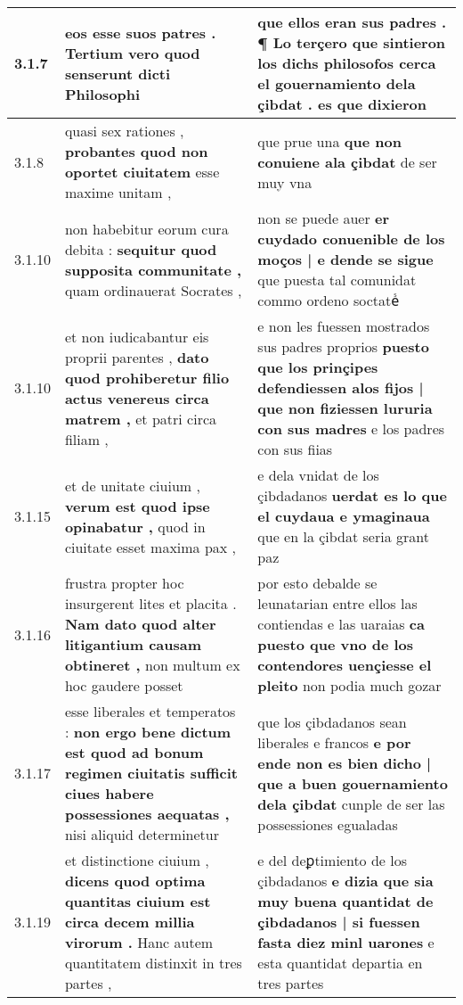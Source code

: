 \begin{tabular}{|p{1cm}|p{6.5cm}|p{6.5cm}|}
3.1.7 & eos esse suos patres . \textbf{ Tertium vero quod senserunt } dicti Philosophi & que ellos eran sus padres . \textbf{ ¶ Lo terçero que sintieron los dichs philosofos cerca el gouernamiento dela çibdat . } es que dixieron \\\hline
3.1.8 & quasi sex rationes , \textbf{ probantes quod non oportet ciuitatem } esse maxime unitam , & que prue una \textbf{ que non conuiene ala çibdat } de ser muy vna \\\hline
3.1.10 & non habebitur eorum cura debita : \textbf{ sequitur quod supposita communitate , } quam ordinauerat Socrates , & non se puede auer \textbf{ er cuydado conuenible de los moços | e dende se sigue } que puesta tal comunidat commo ordeno soctateᷤ \\\hline
3.1.10 & et non iudicabantur eis proprii parentes , \textbf{ dato quod prohiberetur filio actus venereus circa matrem , } et patri circa filiam , & e non les fuessen mostrados sus padres proprios \textbf{ puesto que los prinçipes defendiessen alos fijos | que non fiziessen lururia con sus madres } e los padres con sus fiias \\\hline
3.1.15 & et de unitate ciuium , \textbf{ verum est quod ipse opinabatur , } quod in ciuitate esset maxima pax , & e dela vnidat de los çibdadanos \textbf{ uerdat es lo que el cuydaua e ymaginaua } que en la çibdat seria grant paz \\\hline
3.1.16 & frustra propter hoc insurgerent lites et placita . \textbf{ Nam dato quod alter litigantium causam obtineret , } non multum ex hoc gaudere posset & por esto debalde se leunatarian entre ellos las contiendas e las uaraias \textbf{ ca puesto que vno de los contendores uençiesse el pleito } non podia much gozar \\\hline
3.1.17 & esse liberales et temperatos : \textbf{ non ergo bene dictum est quod ad bonum regimen ciuitatis sufficit ciues habere possessiones aequatas , } nisi aliquid determinetur & que los çibdadanos sean liberales e francos \textbf{ e por ende non es bien dicho | que a buen gouernamiento dela çibdat } cunple de ser las possessiones egualadas \\\hline
3.1.19 & et distinctione ciuium , \textbf{ dicens quod optima quantitas ciuium est circa decem millia virorum . } Hanc autem quantitatem distinxit in tres partes , & e del deꝑtimiento de los çibdadanos \textbf{ e dizia que sia muy buena quantidat de çibdadanos | si fuessen fasta diez minl uarones } e esta quantidat departia en tres partes \\\hline

\end{tabular}
